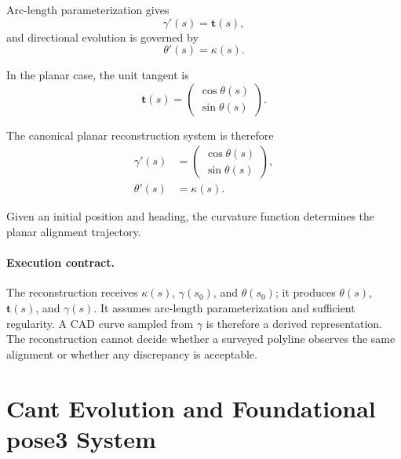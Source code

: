 Arc-length parameterization gives
\begin{equation}
\gamma'(s)=\mathbf t(s),
\label{eq:state-evolution}
\end{equation}
and directional evolution is governed by
\begin{equation}
\theta'(s)=\kappa(s).
\label{eq:curvature-relation}
\end{equation}

In the planar case, the unit tangent is
\begin{equation}
\mathbf t(s)
=
\begin{pmatrix}
\cos\theta(s)\\
\sin\theta(s)
\end{pmatrix}.
\label{eq:planar-tangent}
\end{equation}

The canonical planar reconstruction system is therefore
\begin{equation}
\begin{aligned}
\gamma'(s)
&=
\begin{pmatrix}
\cos\theta(s)\\
\sin\theta(s)
\end{pmatrix},\\
\theta'(s)&=\kappa(s).
\end{aligned}
\label{eq:pose2-system}
\end{equation}

Given an initial position and heading, the curvature function determines
the planar alignment trajectory.

\paragraph{Execution contract.}
The reconstruction receives \(\kappa(s)\), \(\gamma(s_0)\), and
\(\theta(s_0)\); it produces \(\theta(s)\), \(\mathbf t(s)\), and
\(\gamma(s)\). It assumes arc-length parameterization and sufficient
regularity. A CAD curve sampled from \(\gamma\) is therefore a derived
representation. The reconstruction cannot decide whether a surveyed
polyline observes the same alignment or whether any discrepancy is
acceptable.

\section{Cant Evolution and Foundational pose3 System}

